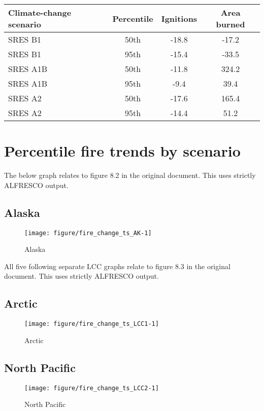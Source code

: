 \documentclass{article}\usepackage[]{graphicx}\usepackage[]{color}
\makeatletter
\def\maxwidth{ %
  \ifdim\Gin@nat@width>\linewidth
    \linewidth
  \else
    \Gin@nat@width
  \fi
}
\newcommand{\headcol}{\rowcolor{tableheadcolor}}
\makeatother
\begin{document}
\begin{table}[ht]
\centering
\begin{tabular}{lccc}
  \headcol 
 \toprule
Climate-change scenario & Percentile & Ignitions & Area burned \\ 
  \midrule
SRES B1 & 50th & -18.8 & -17.2 \\ 
  SRES B1 & 95th & -15.4 & -33.5 \\ 
  SRES A1B & 50th & -11.8 & 324.2 \\ 
  SRES A1B & 95th & -9.4 & 39.4 \\ 
  SRES A2 & 50th & -17.6 & 165.4 \\ 
  SRES A2 & 95th & -14.4 & 51.2 \\ 
   \bottomrule
\end{tabular}
\end{table}


\newpage
\section{Percentile fire trends by scenario}
The below graph relates to figure 8.2 in the original document.
This uses strictly ALFRESCO output.

\subsection{Alaska}
\begin{figure}[H]
\texttt{[image: figure/fire\_change\_ts\_AK-1]} \caption[Alaska]{Alaska\label{fig:fire_change_ts_AK}}
\end{figure}



All five following separate LCC graphs relate to figure 8.3 in the original document.
This uses strictly ALFRESCO output.

\subsection{Arctic}
\begin{figure}[H]
\texttt{[image: figure/fire\_change\_ts\_LCC1-1]} \caption[Arctic]{Arctic\label{fig:fire_change_ts_LCC1}}
\end{figure}



\subsection{North Pacific}
\begin{figure}[H]
\texttt{[image: figure/fire\_change\_ts\_LCC2-1]} \caption[North Pacific]{North Pacific\label{fig:fire_change_ts_LCC2}}
\end{figure}
\end{document}
